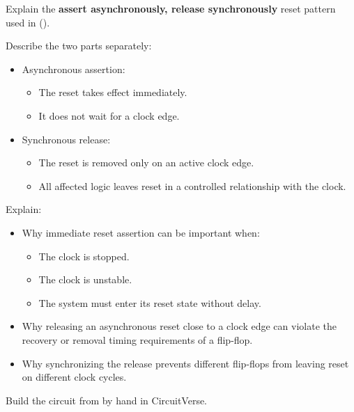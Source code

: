 \label{c4:ex:5}
Explain the \textbf{assert asynchronously, release synchronously} reset pattern used in
 ().

\noindent Describe the two parts separately:
\begin{itemize}
  \item Asynchronous assertion:
    \begin{itemize}
      \item The reset takes effect immediately.
      \item It does not wait for a clock edge.
    \end{itemize}
  \item Synchronous release:
    \begin{itemize}
      \item The reset is removed only on an active clock edge.
      \item All affected logic leaves reset in a controlled relationship with the clock.
    \end{itemize}
\end{itemize}
Explain:
\begin{itemize}
  \item Why immediate reset assertion can be important when:
    \begin{itemize}
      \item The clock is stopped.
      \item The clock is unstable.
      \item The system must enter its reset state without delay.
    \end{itemize}
  \item Why releasing an asynchronous reset close to a clock edge can violate the recovery or
    removal timing requirements of a flip-flop.
  \item Why synchronizing the release prevents different flip-flops from leaving reset on different
    clock cycles.
\end{itemize}

\label{c4:set:3}

\label{c4:ex:6}
Build the  circuit from  by hand in CircuitVerse.

